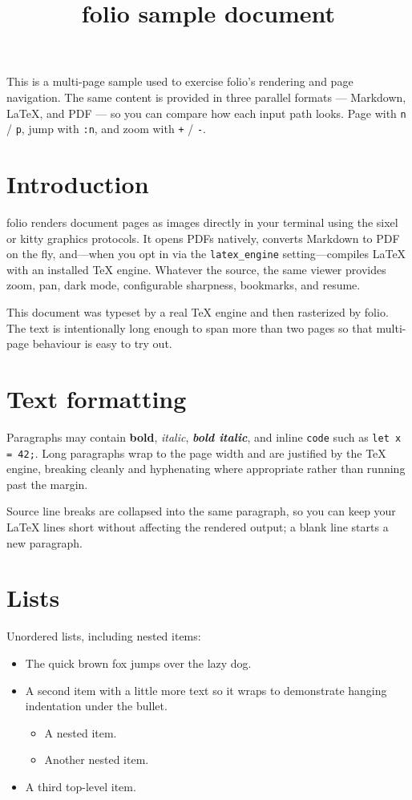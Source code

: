 \documentclass[11pt]{article}
\title{folio sample document}
\author{}
\date{}
\begin{document}
\maketitle

This is a multi-page sample used to exercise folio's rendering and page
navigation. The same content is provided in three parallel formats --- Markdown,
LaTeX, and PDF --- so you can compare how each input path looks. Page with
\texttt{n} / \texttt{p}, jump with \texttt{:n}, and zoom with \texttt{+} /
\texttt{-}.

\section{Introduction}
folio renders document pages as images directly in your terminal using the sixel
or kitty graphics protocols. It opens PDFs natively, converts Markdown to PDF on
the fly, and---when you opt in via the \texttt{latex\_engine} setting---compiles
LaTeX with an installed TeX engine. Whatever the source, the same viewer provides
zoom, pan, dark mode, configurable sharpness, bookmarks, and resume.

This document was typeset by a real TeX engine and then rasterized by folio. The
text is intentionally long enough to span more than two pages so that multi-page
behaviour is easy to try out.

\section{Text formatting}
Paragraphs may contain \textbf{bold}, \textit{italic}, \textbf{\textit{bold
italic}}, and inline \texttt{code} such as \texttt{let x = 42;}. Long paragraphs
wrap to the page width and are justified by the TeX engine, breaking cleanly and
hyphenating where appropriate rather than running past the margin.

Source line breaks are collapsed into the same paragraph, so you can keep your
\LaTeX{} lines short without affecting the rendered output; a blank line starts a
new paragraph.

\section{Lists}
Unordered lists, including nested items:
\begin{itemize}
    \item The quick brown fox jumps over the lazy dog.
    \item A second item with a little more text so it wraps to demonstrate
          hanging indentation under the bullet.
    \begin{itemize}
        \item A nested item.
        \item Another nested item.
    \end{itemize}
    \item A third top-level item.
\end{itemize}
\end{document}
